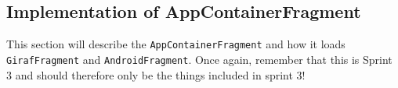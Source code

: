 \subsection{Implementation of AppContainerFragment}
This section will describe the \lstinline!AppContainerFragment! and how it loads \lstinline!GirafFragment! and  \lstinline!AndroidFragment!.
Once again, remember that this is Sprint 3 and should therefore only be the things included in sprint 3!